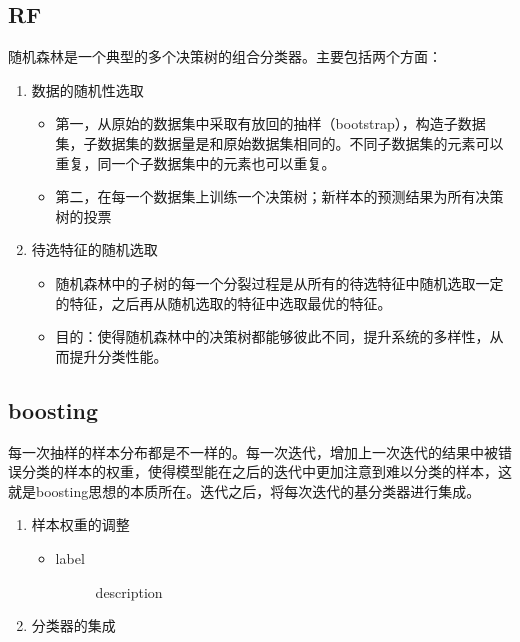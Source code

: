 \documentclass[UTF8]{article}%
\begin{document}
		\subsection{RF}
		随机森林是一个典型的多个决策树的组合分类器。主要包括两个方面：
		\begin{enumerate}
			\item 数据的随机性选取
			\begin{itemize}
				\item 第一，从原始的数据集中采取有放回的抽样（bootstrap），构造子数据集，子数据集的数据量是和原始数据集相同的。\color{red}不同子数据集的元素可以重复，同一个子数据集中的元素也可以重复。\color{black}
				\item 第二，在每一个数据集上训练一个决策树；新样本的预测结果为所有决策树的投票
			\end{itemize}
			\item 待选特征的随机选取
			\begin{itemize}
				\item 随机森林中的子树的每一个分裂过程是从所有的待选特征中随机选取一定的特征，之后再从随机选取的特征中选取最优的特征。
				\item 目的：使得随机森林中的决策树都能够彼此不同，提升系统的多样性，从而提升分类性能。
			\end{itemize}
		\end{enumerate}
		\subsection{boosting}
		每一次抽样的样本分布都是不一样的。每一次迭代，增加上一次迭代的结果中被错误分类的样本的权重，使得模型能在之后的迭代中更加注意到难以分类的样本，这就是boosting思想的本质所在。迭代之后，将每次迭代的基分类器进行集成。
		\begin{enumerate}
			\item 样本权重的调整
			\begin{itemize}
				\item 
				\begin{description}
					\item[label] description
				\end{description}
			\end{itemize}
			\item 分类器的集成
		\end{enumerate}
\end{document}
